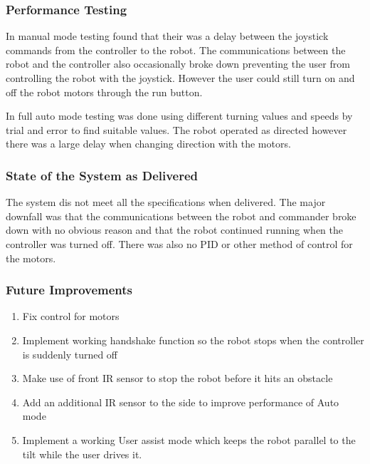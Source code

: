 \documentclass[MTRX3700report.tex]{subfiles}
\begin{document}
\setcounter{subsection}{1} %


\subsubsection{Performance Testing}
In manual mode testing found that their was a delay between the joystick commands from the controller to the robot. The communications between the robot and the controller also occasionally broke down preventing the user from controlling the robot with the joystick. However the user could still turn on and off the robot motors through the run button.

In full auto mode testing was done using different turning values and speeds by trial and error to find suitable values. The robot operated as directed however there was a large delay when changing direction with the motors.
\subsubsection{State of the System as Delivered}
The system dis not meet all the specifications when delivered. The major downfall was that the communications between the robot and commander broke down with no obvious reason and that the robot continued running when the controller was turned off. There was also no PID or other method of control for the motors.
\subsubsection{Future Improvements}
\begin{enumerate}
	\item Fix control for motors
	\item Implement working handshake function so the robot stops when the controller is suddenly turned off
	\item Make use of front IR sensor to stop the robot before it hits an obstacle
	\item Add an additional IR sensor to the side to improve performance of Auto mode 
	\item Implement a working User assist mode which keeps the robot parallel to the tilt while the user drives it.
\end{enumerate}
\end{document}
